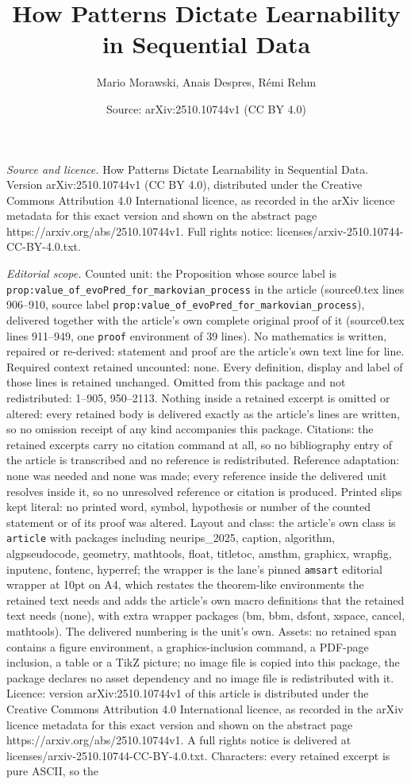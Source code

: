 \documentclass[10pt,a4paper]{amsart}
\title[How Patterns Dictate Learnability in Sequential Data]{How Patterns Dictate Learnability in Sequential Data}
\author{Mario Morawski, Anais Despres, R\'emi Rehm}
\date{Source: arXiv:2510.10744v1 (CC BY 4.0)}
\begin{document}
\maketitle

\noindent\emph{Source and licence.} How Patterns Dictate Learnability in Sequential Data. Version arXiv:2510.10744v1 (CC BY 4.0), distributed under the Creative Commons Attribution 4.0 International licence, as recorded in the arXiv licence metadata for this exact version and shown on the abstract page https://arxiv.org/abs/2510.10744v1. Full rights notice: licenses/arxiv-2510.10744-CC-BY-4.0.txt.\par\smallskip

\noindent\textit{Editorial scope.} Counted unit: the Proposition whose source label is \texttt{prop:value\_of\_evoPred\_for\_markovian\_process} in the article (source0.tex lines 906--910, source label \texttt{prop:value\_of\_evoPred\_for\_markovian\_process}), delivered together with the article's own complete original proof of it (source0.tex lines 911--949, one \texttt{proof} environment of 39 lines). No mathematics is written, repaired or re-derived: statement and proof are the article's own text line for line. Required context retained uncounted: none. Every definition, display and label of those lines is retained unchanged. Omitted from this package and not redistributed: 1--905, 950--2113. Nothing inside a retained excerpt is omitted or altered: every retained body is delivered exactly as the article's lines are written, so no omission receipt of any kind accompanies this package. Citations: the retained excerpts carry no citation command at all, so no bibliography entry of the article is transcribed and no reference is redistributed. Reference adaptation: none was needed and none was made; every reference inside the delivered unit resolves inside it, so no unresolved reference or citation is produced. Printed slips kept literal: no printed word, symbol, hypothesis or number of the counted statement or of its proof was altered. Layout and class: the article's own class is \texttt{article} with packages including neurips\_2025, caption, algorithm, algpseudocode, geometry, mathtools, float, titletoc, amsthm, graphicx, wrapfig, inputenc, fontenc, hyperref; the wrapper is the lane's pinned \texttt{amsart} editorial wrapper at 10pt on A4, which restates the theorem-like environments the retained text needs and adds the article's own macro definitions that the retained text needs (none), with extra wrapper packages (bm, bbm, dsfont, xspace, cancel, mathtools). The delivered numbering is the unit's own. Assets: no retained span contains a figure environment, a graphics-inclusion command, a PDF-page inclusion, a table or a TikZ picture; no image file is copied into this package, the package declares no asset dependency and no image file is redistributed with it. Licence: version arXiv:2510.10744v1 of this article is distributed under the Creative Commons Attribution 4.0 International licence, as recorded in the arXiv licence metadata for this exact version and shown on the abstract page https://arxiv.org/abs/2510.10744v1. A full rights notice is delivered at licenses/arxiv-2510.10744-CC-BY-4.0.txt. Characters: every retained excerpt is pure ASCII, so the 
\end{document}
